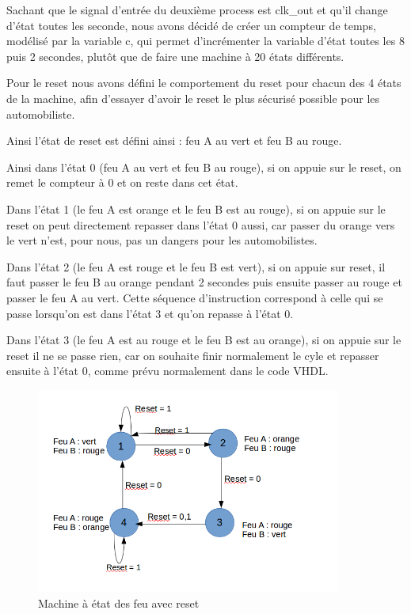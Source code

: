 \documentclass[11pt]{report}
\begin{document}
Sachant que le signal d'entrée du deuxième process est clk\_out et qu'il change d'état toutes les seconde, nous avons décidé de créer un compteur de temps, modélisé par la variable c, qui permet d'incrémenter la variable d'état toutes les 8 puis 2 secondes, plutôt que de faire une machine à 20 états différents.

Pour le reset nous avons défini le comportement du reset pour chacun des 4 états de la machine, afin d'essayer d'avoir le reset le plus sécurisé possible pour les automobiliste.

Ainsi l'état de reset est défini ainsi : feu A au vert et feu B au rouge.

Ainsi dans l'état 0 (feu A au vert et feu B au rouge), si on appuie sur le reset, on remet le compteur à 0 et on reste dans cet état.

Dans l'état 1 (le feu A est orange et le feu B est au rouge), si on appuie sur le reset on peut directement repasser dans l'état 0 aussi, car passer du orange vers le vert n'est, pour nous, pas un dangers pour les automobilistes.

Dans l'état 2 (le feu A est rouge et le feu B est vert), si on appuie sur reset, il faut passer le feu B au orange pendant 2 secondes puis ensuite passer au rouge et passer le feu A au vert. Cette séquence d'instruction correspond à celle qui se passe lorsqu'on est dans l'état 3 et qu'on repasse à l'état 0.

Dans l'état 3 (le feu A est au rouge et le feu B est au orange), si on appuie sur le reset il ne se passe rien, car on souhaite finir normalement le cyle et repasser ensuite à l'état 0, comme prévu normalement dans le code VHDL. 

\begin{figure}[h]
\includegraphics[width=10cm]{TP03-3.png}
\caption{Machine à état des feu avec reset}
\end{figure}
\end{document}
